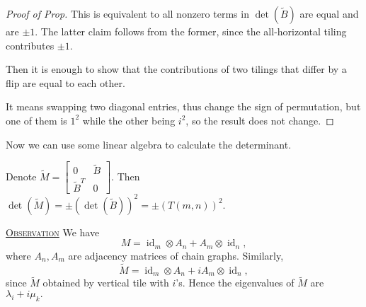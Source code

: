 \documentclass{report}
\def \id {\operatorname{id}}
\newcommand{\fancyem}[1]{\underline{\textsc{#1}}}
\theoremstyle{definition}
\theoremstyle{remark}
\numberwithin{equation}{section}
\begin{document}
\begin{proof}[Proof of Prop]
This is equivalent to all nonzero terms in $\det(\tilde{B})$ are equal and are $\pm 1.$ The latter claim follows from the former, since the all-horizontal tiling contributes $\pm 1$.

Then it is enough to show that the contributions of two tilings that differ by a flip are equal to each other.

It means swapping two diagonal entries, thus change the sign of permutation, but one of them is $1^2$ while the other being $i^2$, so the result does not change.
\end{proof}

Now we can use some linear algebra to calculate the determinant.

Denote $\tilde{M} = \begin{bmatrix}
0 & \tilde{B} \\
\tilde{B}^T & 0
\end{bmatrix}$. Then $\det(\tilde{M}) = \pm (\det(\tilde{B}))^2 = \pm (T(m, n))^2.$

\fancyem{Observation} We have \[M = \id_m \otimes A_n + A_m \otimes \id_n,\] where $A_n, A_m$ are adjacency matrices of chain graphs. Similarly,
\[
\tilde{M} = \id_m \otimes A_n + iA_m \otimes \id_n,
\]
since $\tilde{M}$ obtained by vertical tile with $i$'s. Hence the eigenvalues of $\tilde{M}$ are $\lambda_i + i\mu_k.$
\end{document}

